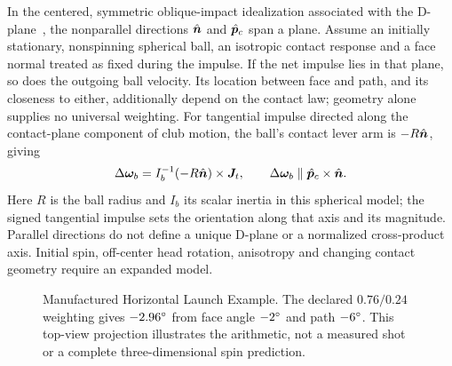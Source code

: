 In the centered, symmetric oblique-impact idealization associated with the D-plane~\cite{jorgensen}, the nonparallel directions $\hat{\bm{n}}$ and $\hat{\bm{p}}_c$ span a plane.
Assume an initially stationary, nonspinning spherical ball, an isotropic contact response and a face normal treated as fixed during the impulse.
If the net impulse lies in that plane, so does the outgoing ball velocity.
Its location between face and path, and its closeness to either, additionally depend on the contact law; geometry alone supplies no universal weighting.
For tangential impulse directed along the contact-plane component of club motion, the ball's contact lever arm is $-R\hat{\bm{n}}$, giving
\begin{equation}
\label{eq:spinaxisdplane}
\Delta\boldsymbol\omega_b
 = I_b^{-1}(-R\hat{\bm{n}})\times\bm{J}_t,
\qquad
\Delta\boldsymbol\omega_b\parallel\hat{\bm{p}}_c\times\hat{\bm{n}}.
\end{equation}
Here $R$ is the ball radius and $I_b$ its scalar inertia in this spherical model; the signed tangential impulse sets the orientation along that axis and its magnitude.
Parallel directions do not define a unique D-plane or a normalized cross-product axis.
Initial spin, off-center head rotation, anisotropy and changing contact geometry require an expanded model.

\begin{figure}[htbp]
\centering
{}
\caption{Manufactured Horizontal Launch Example.
The declared $0.76/0.24$ weighting gives $-2.96\si{\degree}$ from face angle $-2\si{\degree}$ and path $-6\si{\degree}$.
This top-view projection illustrates the arithmetic, not a measured shot or a complete three-dimensional spin prediction.}
\label{fig:dplane}
\end{figure}

